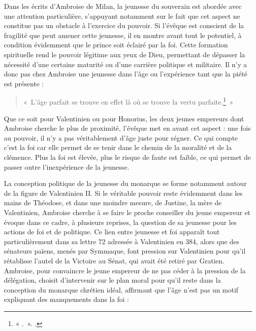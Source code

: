 \bigskip

Dans les écrits d’Ambroise de Milan, la jeunesse du souverain est abordée avec une attention particulière, s'appuyant notamment sur le fait que cet aspect ne constitue pas un obstacle à l’exercice du pouvoir. Si l’évêque est conscient de la fragilité que peut amener cette jeunesse, il en montre avant tout le potentiel, à condition évidemment que le prince soit éclairé par la foi. Cette formation spirituelle rend le pouvoir légitime aux yeux de Dieu, permettant de dépasser la nécessité d’une certaine maturité ou d’une carrière politique et militaire. Il n’y a donc pas chez Ambroise une jeunesse dans l’âge ou l’expérience tant que la piété est présente :

\bigskip

\begin{quote}
«~L’âge parfait se trouve en effet là où se trouve la vertu parfaite.\footnote{« .~». \cite[]{ambroise_mort_theodose}.}~»
\end{quote}

\bigskip

Que ce soit pour Valentinien ou pour Honorius, les deux jeunes empereurs dont Ambroise cherche le plus de proximité, l'évêque met en avant cet aspect : une fois au pouvoir, il n'y a pas véritablement d'âge juste pour régner. Ce qui compte c'est la foi car elle permet de se tenir dans le chemin de la moralité et de la clémence. Plus la foi est élevée, plus le risque de faute est faible, ce qui permet de passer outre l'inexpérience de la jeunesse.

\bigskip

La conception politique de la jeunesse du monarque se forme notamment autour de la figure de Valentinien II. Si le véritable pouvoir reste évidemment dans les mains de Théodose, et dans une moindre mesure, de Justine, la mère de Valentinien, Ambroise cherche à se faire le proche conseiller du jeune empereur et évoque dans ce cadre, à plusieurs reprises, la question de sa jeunesse pour les actions de foi et de politique. Ce lien entre jeunesse et foi apparaît tout particulièrement dans sa lettre 72 adressée à Valentinien en 384, alors que des sénateurs païens, menés par Symmaque, font pression sur Valentinien pour qu’il rétablisse l’autel de la Victoire au Sénat, qui avait été retiré par Gratien. Ambroise, pour convaincre le jeune empereur de ne pas céder à la pression de la délégation, choisit d’intervenir sur le plan moral pour qu’il reste dans la conception du monarque chrétien idéal, affirmant que l’âge n’est pas un motif expliquant des manquements dans la foi :

